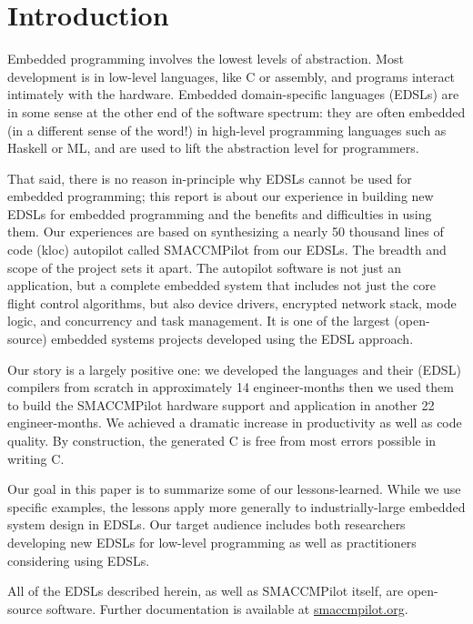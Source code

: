 \section{Introduction}

Embedded programming involves the lowest levels of abstraction.  Most development
is in low-level languages, like C or assembly, and programs interact intimately
with the hardware.  Embedded domain-specific languages (EDSLs) are in
some sense at the other end of the software spectrum: they are often embedded
(in a different sense of the word!) in high-level programming languages such as
Haskell or ML, and are used to lift the abstraction level for programmers.

That said, there is no reason in-principle why EDSLs cannot be used for embedded
programming; this report is about our experience in building new EDSLs for
embedded programming and the benefits and difficulties in using them.  Our
experiences are based on synthesizing a nearly 50 thousand lines of code (kloc)
autopilot called SMACCMPilot from our EDSLs.  The breadth and scope of the
project sets it apart.  The autopilot software is not just an application, but a
complete embedded system that includes not just the core flight control
algorithms, but also device drivers, encrypted network stack, mode logic, and
concurrency and task management.  It is one of the largest (open-source)
embedded systems projects developed using the EDSL approach.

Our story is a largely positive one: we developed the languages and their (EDSL)
compilers from scratch in approximately 14 engineer-months then we used them to
build the SMACCMPilot hardware support and application in another 22
engineer-months.  We achieved a dramatic increase in productivity as well as
code quality.  By construction, the generated C is free from most errors
possible in writing C.

Our goal in this paper is to summarize some of our lessons-learned.  While we
use specific examples, the lessons apply more generally to industrially-large
embedded system design in EDSLs.  Our target audience includes both researchers
developing new EDSLs for low-level programming as well as practitioners
considering using EDSLs.

All of the EDSLs described herein, as well as SMACCMPilot itself, are
open-source software. Further documentation is available at \url{smaccmpilot.org}.




